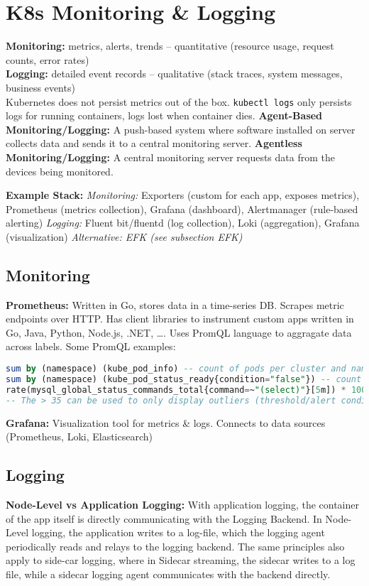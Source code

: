 \section{K8s Monitoring \& Logging}
\textbf{Monitoring:} metrics, alerts, trends – quantitative (resource usage, request counts, error rates)\\
\textbf{Logging:} detailed event records – qualitative (stack traces, system messages, business events) \\
Kubernetes does not persist metrics out of the box. \texttt{kubectl logs} only persists logs for running containers, logs lost when container dies.
\textbf{Agent-Based Monitoring/Logging:} A push-based system where software installed on server collects data and sends it to a central monitoring server. \textbf{Agentless Monitoring/Logging:} A central monitoring server requests data from the devices being monitored.

\begin{mdframed}
	\textbf{Example Stack:} \textit{Monitoring:} Exporters (custom for each app, exposes metrics), Prometheus (metrics collection), Grafana (dashboard), Alertmanager (rule-based alerting) \textit{Logging:} Fluent bit/fluentd (log collection), Loki (aggregation), Grafana (visualization)
	\textit{Alternative: EFK (see subsection EFK)}
\end{mdframed}

\subsection{Monitoring}
\textbf{Prometheus:} Written in Go, stores data in a time-series DB. Scrapes metric endpoints over HTTP. Has client libraries to instrument custom apps written in Go, Java, Python, Node.js, .NET, \dots. Uses PromQL language to aggragate data across labels. Some PromQL examples:
\begin{lstlisting}[language=sql]
sum by (namespace) (kube_pod_info) -- count of pods per cluster and namespace
sum by (namespace) (kube_pod_status_ready{condition="false"}) -- count of pods not ready by namespace
rate(mysql_global_status_commands_total{command=~"(select)"}[5m]) * 100 > 35 -- Rate of MySQL SELECT commands over last 5 minutes
-- The > 35 can be used to only display outliers (threshold/alert conditions)
\end{lstlisting}

\textbf{Grafana:} Visualization tool for metrics \& logs. Connects to data sources (Prometheus, Loki, Elasticsearch)
\subsection{Logging}
\textbf{Node-Level vs Application Logging:} With application logging, the container of the app itself is directly communicating with the Logging Backend. In Node-Level logging, the application writes to a log-file, which the logging agent periodically reads and relays to the logging backend. The same principles also apply to side-car logging, where in Sidecar streaming, the sidecar writes to a log file, while a sidecar logging agent communicates with the backend directly.

